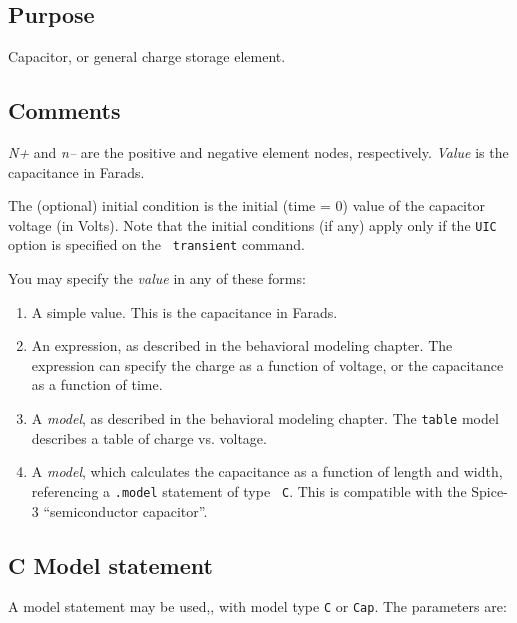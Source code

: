 \subsection{Purpose}

Capacitor, or general charge storage element.
\subsection{Comments}

{\it N+} and {\it n--} are the positive and negative element nodes,
respectively.  {\it Value} is the capacitance in Farads.

The (optional) initial condition is the initial (time = 0) value of
the capacitor voltage (in Volts).  Note that the initial conditions
(if any) apply only if the {\tt UIC} option is specified on the {\tt
transient} command.

You may specify the {\it value} in any of these forms:

\begin{enumerate}
  
\item
A simple value.  This is the capacitance in Farads.
  
\item
An expression, as described in the behavioral modeling chapter.  The
expression can specify the charge as a function of voltage, or the
capacitance as a function of time.

\item
A {\it model}, as described in the behavioral modeling chapter.  The
{\tt table} model describes a table of charge vs. voltage.
  
\item
A {\it model}, which calculates the capacitance as a function of
length and width, referencing a {\tt .model} statement of type {\tt
C}.  This is compatible with the Spice-3 ``semiconductor capacitor''.

\end{enumerate}
\subsection{C Model statement}

A model statement may be used,, with model type {\tt C} or {\tt Cap}.
The parameters are:

